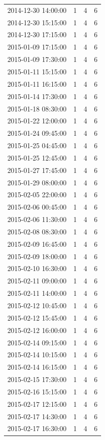 \begin{tabular}{lrrr}
2014-12-30 14:00:00 & 1 & 4 & 6 \\
2014-12-30 15:15:00 & 1 & 4 & 6 \\
2014-12-30 17:15:00 & 1 & 4 & 6 \\
2015-01-09 17:15:00 & 1 & 4 & 6 \\
2015-01-09 17:30:00 & 1 & 4 & 6 \\
2015-01-11 15:15:00 & 1 & 4 & 6 \\
2015-01-11 16:15:00 & 1 & 4 & 6 \\
2015-01-14 17:30:00 & 1 & 4 & 6 \\
2015-01-18 08:30:00 & 1 & 4 & 6 \\
2015-01-22 12:00:00 & 1 & 4 & 6 \\
2015-01-24 09:45:00 & 1 & 4 & 6 \\
2015-01-25 04:45:00 & 1 & 4 & 6 \\
2015-01-25 12:45:00 & 1 & 4 & 6 \\
2015-01-27 17:45:00 & 1 & 4 & 6 \\
2015-01-29 08:00:00 & 1 & 4 & 6 \\
2015-02-05 22:00:00 & 1 & 4 & 6 \\
2015-02-06 00:45:00 & 1 & 4 & 6 \\
2015-02-06 11:30:00 & 1 & 4 & 6 \\
2015-02-08 08:30:00 & 1 & 4 & 6 \\
2015-02-09 16:45:00 & 1 & 4 & 6 \\
2015-02-09 18:00:00 & 1 & 4 & 6 \\
2015-02-10 16:30:00 & 1 & 4 & 6 \\
2015-02-11 09:00:00 & 1 & 4 & 6 \\
2015-02-11 14:00:00 & 1 & 4 & 6 \\
2015-02-12 10:45:00 & 1 & 4 & 6 \\
2015-02-12 15:45:00 & 1 & 4 & 6 \\
2015-02-12 16:00:00 & 1 & 4 & 6 \\
2015-02-14 09:15:00 & 1 & 4 & 6 \\
2015-02-14 10:15:00 & 1 & 4 & 6 \\
2015-02-14 16:15:00 & 1 & 4 & 6 \\
2015-02-15 17:30:00 & 1 & 4 & 6 \\
2015-02-16 15:15:00 & 1 & 4 & 6 \\
2015-02-17 12:15:00 & 1 & 4 & 6 \\
2015-02-17 14:30:00 & 1 & 4 & 6 \\
2015-02-17 16:30:00 & 1 & 4 & 6 \\

\end{tabular}
